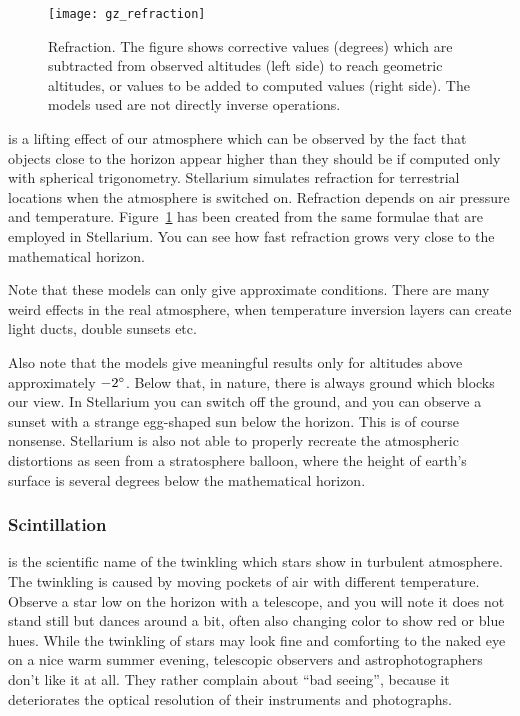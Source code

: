 
\begin{figure}%
\centering\texttt{[image: gz\_refraction]}
\caption{Refraction. The figure shows corrective values (degrees)
  which are subtracted from observed altitudes (left side) to reach
  geometric altitudes, or values to be added to computed values (right
  side). The models used are not directly inverse operations.}
\label{fig:Refraction}
\end{figure}


 is a lifting effect of our
atmosphere which can be observed by the fact that objects close to the
horizon appear higher than they should be if computed only with
spherical trigonometry. Stellarium simulates refraction for
terrestrial locations when the atmosphere is switched on. Refraction
depends on air pressure and temperature. Figure~\ref{fig:Refraction}
has been created from the same formulae that are employed in
Stellarium. You can see how fast refraction grows very close to the
mathematical horizon.

Note that these models can only give approximate conditions. There are
many weird effects in the real atmosphere, when temperature inversion
layers can create light ducts, double sunsets etc.

Also note that the models give meaningful results only for altitudes
above approximately $-2\degree$. Below that, in nature, there is
always ground which blocks our view. In Stellarium you can switch off
the ground, and you can observe a sunset with a strange egg-shaped sun
below the horizon. This is of course nonsense. Stellarium is also not
able to properly recreate the atmospheric distortions as seen from a
stratosphere balloon, where the height of earth's surface is several
degrees below the mathematical horizon.

\subsubsection{Scintillation}
\label{sec:phenomena:Scintillation}
 is the scientific name of the twinkling which stars show
in turbulent atmosphere. The twinkling is caused by moving pockets of air with different temperature. 
Observe a star low on the horizon with a telescope, and you will note it does not stand still 
but dances around a bit, often also changing color to show red or blue hues.
While the twinkling of stars may look fine and comforting to the naked eye on a nice warm summer evening, 
telescopic observers and astrophotographers don't like it at all. They rather complain about ``bad seeing'', 
because it deteriorates the optical resolution of their instruments and photographs. 

